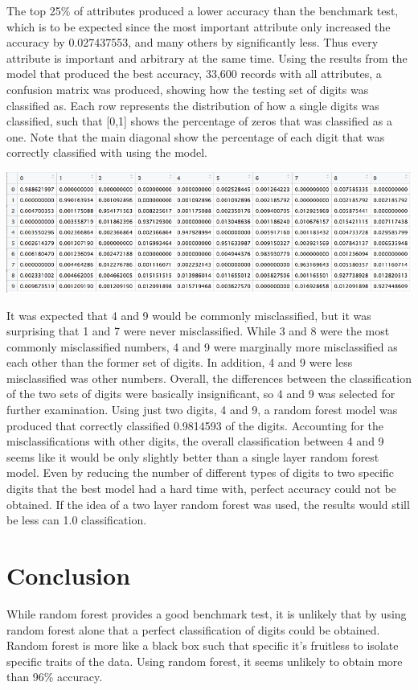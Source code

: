 \documentclass[a4paper]{article}
\begin{document}
\begin{doublespace}
The top 25\% of attributes produced a lower accuracy than the benchmark test, which is to be expected since the most important attribute only increased the accuracy by 0.027437553, and many others by significantly less. Thus every attribute is important and arbitrary at the same time. Using the results from the model that produced the best accuracy, 33,600 records with all attributes, a confusion matrix was produced, showing how the testing set of digits was classified as. Each row represents the distribution of how a single digits was classified, such that [0,1] shows the percentage of zeros that was classified as a one. Note that the main diagonal show the percentage of each digit that was correctly classified with using the model.

\begin{center}
\includegraphics[scale=0.5]{CM.jpeg}
\end{center}

It was expected that 4 and 9 would be commonly misclassified, but it was surprising that 1 and 7 were never misclassified. While 3 and 8 were the most commonly misclassified numbers, 4 and 9 were marginally more misclassified as each other than the former set of digits. In addition, 4 and 9 were less misclassified was other numbers. Overall, the differences between the classification of the two sets of digits were basically insignificant, so 4 and 9 was selected for further examination. Using just two digits, 4 and 9, a random forest model was produced that correctly classified 0.9814593 of the digits. Accounting for the misclassifications with other digits, the overall classification between 4 and 9 seems like it would be only slightly better than a single layer random forest model. Even by reducing the number of different types of digits to two specific digits that the best model had a hard time with, perfect accuracy could not be obtained. If the idea of a two layer random forest was used, the results would still be less can 1.0 classification.

\newpage

\section{Conclusion}
While random forest provides a good benchmark test, it is unlikely that by using random forest alone that a perfect classification of digits could be obtained. Random forest is more like a black box such that specific it's fruitless to isolate specific traits of the data. Using random forest, it seems unlikely to obtain more than 96\% accuracy.


\end{doublespace}
\end{document}
